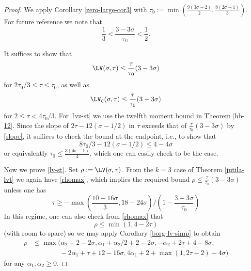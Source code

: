 \begin{proof}  We apply Corollary \ref{zero-large-cor3} with $\tau_0 := \min( \frac{ 9(3\sigma-2)}{2}, \frac{8(2\sigma-1)}{3} )$.  For future reference we note that
\begin{equation}\label{slope}
    \frac{1}{3} < \frac{3-3\sigma}{\tau_0} < \frac{1}{2}.
\end{equation}

It suffices to show that
\begin{equation}\label{lv-st}
 \LV(\sigma,\tau) \leq \frac{\tau}{\tau_0} (3-3\sigma)
\end{equation}
for $2\tau_0/3 \leq \tau \leq \tau_0$, as well as
\begin{equation}\label{lvz-st}
\LV_\zeta(\sigma,\tau) \leq \frac{\tau}{\tau_0} (3-3\sigma)
\end{equation}
for $2 \leq \tau < 4\tau_0/3$.
For \eqref{lvz-st} we use the twelfth moment bound in Theorem \ref{hb-12}.  Since the slope of
$2\tau - 12 (\sigma-1/2)$ in $\tau$ exceeds that of $\frac{\tau}{\tau_0} (3-3\sigma)$ by \eqref{slope}, it suffices to check the bound at the endpoint, i.e., to show that
$$ 8\tau_0/3 - 12 (\sigma-1/2) \leq 4 -4\sigma$$
or equivalently $\tau_0 \leq \frac{3(4\sigma-1)}{4}$, which one can easily check to be the case.

Now we prove \eqref{lv-st}.  Set $\rho := \LV(\sigma,\tau)$.  From the $k=3$ case of Theorem \ref{jutila-lvt} we again have
\eqref{rhomax}, which implies the required bound $\rho \leq \frac{\tau}{\tau_0}(3-3\sigma)$ unless one has
\begin{equation}\label{tau-lower}
    \tau \geq - \max( \frac{10-16\sigma}{3}, 18-24\sigma) / (1 - \frac{3-3\sigma}{\tau_0})
\end{equation}
In this regime, one can also check from \eqref{rhomax} that
$$ \rho \leq \min(1, 4-2\tau)$$
(with room to spare) so we may apply Corollary \ref{borg-lv-simp} to obtain
\begin{equation}\label{40-alt}
\begin{split}
\rho &\leq \max( \alpha_2 + 2 - 2 \sigma, \alpha_1+\alpha_2/2 + 2-2\sigma, -\alpha_2 + 2\tau+4-8\sigma, \\
&\qquad\qquad -2\alpha_1 + \tau + 12 - 16 \sigma, 4\alpha_1 + 2+\max(1,2\tau-2)-4\sigma)
\end{split}
\end{equation}
for any $\alpha_1, \alpha_2 \geq 0$.


\end{proof}
